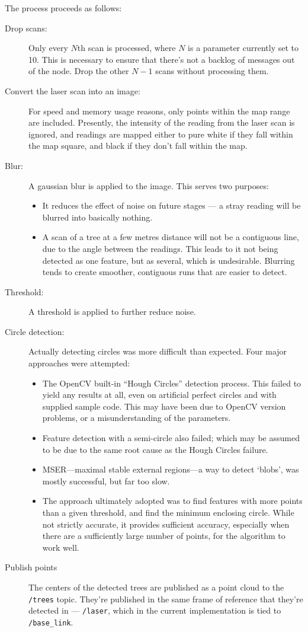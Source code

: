 \documentclass[12pt,oneside,a4paper]{book}
\begin{document}
The process proceeds as follows:
\begin{description}
\item[Drop scans:] Only every $N$th scan is processed, where $N$ is a
  parameter currently set to 10. This is necessary to ensure that
  there's not a backlog of messages out of the node. Drop the other
  $N-1$ scans without processing them.
\item[Convert the laser scan into an image:] For speed and memory usage
  reasons, only points within the map range are included. Presently,
  the intensity of the reading from the laser scan is ignored, and
  readings are mapped either to pure white if they fall within the map
  square, and black if they don't fall within the map.
\item[Blur:] A gaussian blur is applied to the image. This serves two
  purposes:
  \begin{itemize}
  \item It reduces the effect of noise on future stages --- a stray
    reading will be blurred into basically nothing.
  \item A scan of a tree at a few metres distance will not be a
    contiguous line, due to the angle between the readings. This leads
    to it not being detected as one feature, but as several, which is
    undesirable. Blurring tends to create smoother, contiguous runs
    that are easier to detect.
  \end{itemize}
\item[Threshold:] A threshold is applied to further reduce noise.
\item[Circle detection:] Actually detecting circles was more difficult
  than expected. Four major approaches were attempted:
  \begin{itemize}
  \item The OpenCV built-in ``Hough Circles'' detection process. This
    failed to yield any results at all, even on artificial perfect
    circles and with supplied sample code. This may have been due to
    OpenCV version problems, or a misunderstanding of the parameters.
  \item Feature detection with a semi-circle also failed; which may be
    assumed to be due to the same root cause as the Hough Circles
    failure.
  \item MSER---maximal stable external regions---a way to detect
    `blobs', was mostly successful, but far too slow.
  \item The approach ultimately adopted was to find features with more
    points than a given threshold, and find the minimum enclosing
    circle. While not strictly accurate, it provides sufficient
    accuracy, especially when there are a sufficiently large number of
    points, for the algorithm to work well.
  \end{itemize}
\item[Publish points] The centers of the detected trees are published
  as a point cloud to the \texttt{/trees} topic. They're published in
  the same frame of reference that they're detected in ---
  \texttt{/laser}, which in the current implementation is tied to
  \texttt{/base\_link}.
\end{description}
\end{document}

